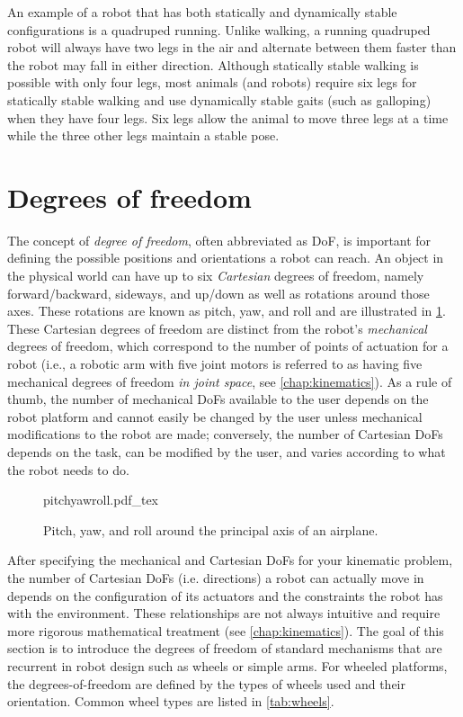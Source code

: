 An example of a robot that has both statically and dynamically stable configurations is a quadruped running. Unlike walking, a running quadruped robot will always have two legs in the air and alternate between them faster than the robot may fall in either direction. Although statically stable walking is possible with only four legs, most animals (and robots) require six legs for statically stable walking and use dynamically stable gaits (such as galloping) when they have four legs. Six legs allow the animal to move three legs at a time while the three other legs maintain a stable pose.


\section{Degrees of freedom}\label{sec:dof}

The concept of \textsl{degree of freedom}, often abbreviated as DoF, is important for defining the possible positions and orientations a robot can reach. An object in the physical world can have up to six \textsl{Cartesian} degrees of freedom, namely forward/backward, sideways, and up/down as well as rotations around those axes. These rotations are known as pitch, yaw, and roll and are illustrated in \cref{fig:pitchyawandroll}. These Cartesian degrees of freedom are distinct from the robot's \textsl{mechanical} degrees of freedom, which correspond to the number of points of actuation for a robot (i.e., a robotic arm with five joint motors is referred to as having five mechanical degrees of freedom \textsl{in joint space}, see \cref{chap:kinematics}).
As a rule of thumb, the number of mechanical DoFs available to the user depends on the robot platform and cannot easily be changed by the user unless mechanical modifications to the robot are made; conversely, the number of Cartesian DoFs depends on the task, can be modified by the user, and varies according to what the robot needs to do.

\begin{figure}
    \centering
    \def\svgwidth{\textwidth}
    {pitchyawroll.pdf_tex}
    \caption{Pitch, yaw, and roll around the principal axis of an airplane.}
    \label{fig:pitchyawandroll}
\end{figure}

After specifying the mechanical and Cartesian DoFs for your kinematic problem, the number of Cartesian DoFs (i.e. directions) a robot can actually move in depends on the configuration of its actuators and the constraints the robot has with the environment. These relationships are not always intuitive and require more rigorous mathematical treatment (see \cref{chap:kinematics}). The goal of this section is to introduce the degrees of freedom of standard mechanisms that are recurrent in robot design such as wheels or simple arms. For wheeled platforms, the degrees-of-freedom are defined by the types of wheels used and their orientation. Common wheel types are listed in \cref{tab:wheels}.

